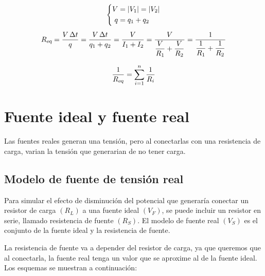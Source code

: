 \begin{gather*}
    \left\{
    \begin{aligned}
        V &= {\left| {V_1} \right|} = {\left| {V_2} \right|}
        \\
        q &= q_1 + q_2
    \end{aligned}
    \right.
    \\[1ex]
    {{R}_\textsl{{eq}}} = \frac{V \, \Delta t}{q}
    = \frac{V \, \Delta t}{q_1 + q_2}
    = \frac{V}{I_1 + I_2} = \frac{V}{\dfrac{V}{R_1} + \dfrac{V}{R_2}}
    = \frac{1}{\dfrac{1}{R_1}+\dfrac{1}{R_2}}
\end{gather*}

\begin{mdframed}[style=PropertyFrame]
    \begin{prop}
    \end{prop}
    \begin{equation*}
        \frac{1}{{{R}_\textsl{{eq}}}} = \sum_{i=1}^n \frac{1}{R_i}
    \end{equation*}
\end{mdframed}


\section{Fuente ideal y fuente real}

Las fuentes reales generan una tensión, pero al conectarlas con una resistencia de carga, varian la tensión que generarian de no tener carga.


\subsection{Modelo de fuente de tensión real}

Para simular el efecto de disminución del potencial que generaría conectar un resistor de carga $(R_L)$ a una fuente ideal $(V_F)$, se puede incluir un resistor en serie, llamado resistencia de fuente $(R_S)$.
El modelo de fuente real $(V_S)$ es el conjunto de la fuente ideal y la resistencia de fuente.

La resistencia de fuente va a depender del resistor de carga, ya que queremos que al conectarla, la fuente real tenga un valor que se aproxime al de la fuente ideal.
Los esquemas se muestran a continuación:

\begin{multicols}{2}
    \begin{center}
        \def\svgwidth{0.9\linewidth}
        
    \end{center}
    \begin{center}
        \def\svgwidth{0.9\linewidth}
        
    \end{center}
\end{multicols}

